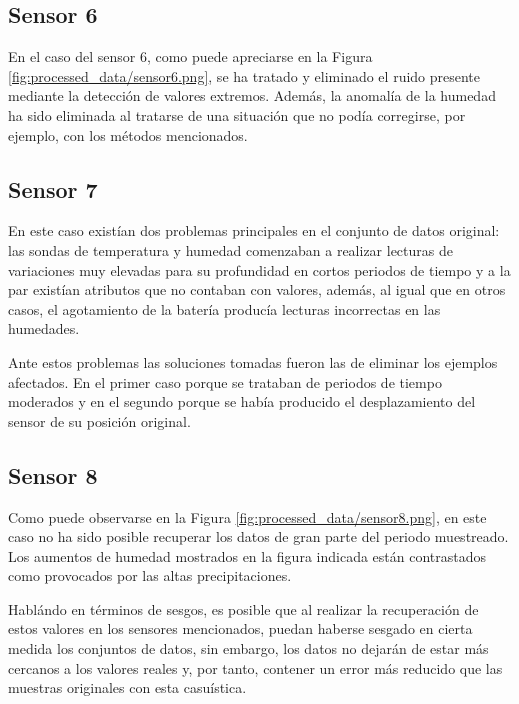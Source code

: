 \subsection{Sensor 6}

En el caso del sensor 6, como puede apreciarse en la Figura 
\ref{fig:processed_data/sensor6.png}, se ha tratado y eliminado el ruido presente 
mediante la detección de valores extremos. Además, la anomalía de la humedad ha sido
eliminada al tratarse de una situación que no podía corregirse, por ejemplo, con los
métodos mencionados.

\newpage

\subsection{Sensor 7}

En este caso existían dos problemas principales en el conjunto de datos original:
las sondas de temperatura y humedad comenzaban a realizar lecturas de variaciones
muy elevadas para su profundidad en cortos periodos de tiempo y a la par
existían atributos que no contaban con valores, además, al igual que en otros casos,
el agotamiento de la batería producía lecturas incorrectas en las humedades.

Ante estos problemas las soluciones tomadas fueron las de eliminar los ejemplos 
afectados. En el primer caso porque se trataban de periodos de tiempo moderados y 
en el segundo porque se había producido el desplazamiento del sensor de su posición 
original.

\newpage

\subsection{Sensor 8}

Como puede observarse en la Figura \ref{fig:processed_data/sensor8.png}, en este caso
no ha sido posible recuperar los datos de gran parte del periodo muestreado.
Los aumentos de humedad mostrados en la figura indicada están contrastados como 
provocados por las altas precipitaciones.

Hablándo en términos de sesgos, es posible que al realizar la recuperación de estos
valores en los sensores mencionados, puedan haberse sesgado en cierta medida
los conjuntos de datos, sin embargo, los datos no dejarán de estar más cercanos a los
valores reales y, por tanto, contener un error más reducido que las muestras originales
con esta casuística.
